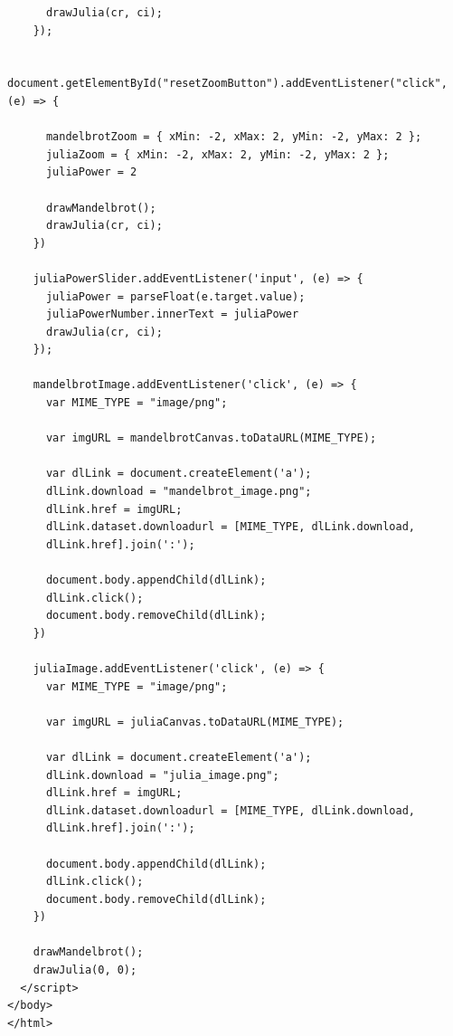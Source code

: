 \documentclass[12pt,a4paper]{report}
\begin{document}
\begin{verbatim}
      drawJulia(cr, ci);
    });

    document.getElementById("resetZoomButton").addEventListener("click", (e) => {

      mandelbrotZoom = { xMin: -2, xMax: 2, yMin: -2, yMax: 2 };
      juliaZoom = { xMin: -2, xMax: 2, yMin: -2, yMax: 2 };
      juliaPower = 2

      drawMandelbrot();
      drawJulia(cr, ci);
    })

    juliaPowerSlider.addEventListener('input', (e) => {
      juliaPower = parseFloat(e.target.value);
      juliaPowerNumber.innerText = juliaPower
      drawJulia(cr, ci);
    });

    mandelbrotImage.addEventListener('click', (e) => {
      var MIME_TYPE = "image/png";

      var imgURL = mandelbrotCanvas.toDataURL(MIME_TYPE);

      var dlLink = document.createElement('a');
      dlLink.download = "mandelbrot_image.png";
      dlLink.href = imgURL;
      dlLink.dataset.downloadurl = [MIME_TYPE, dlLink.download, 
      dlLink.href].join(':');

      document.body.appendChild(dlLink);
      dlLink.click();
      document.body.removeChild(dlLink);
    })

    juliaImage.addEventListener('click', (e) => {
      var MIME_TYPE = "image/png";

      var imgURL = juliaCanvas.toDataURL(MIME_TYPE);

      var dlLink = document.createElement('a');
      dlLink.download = "julia_image.png";
      dlLink.href = imgURL;
      dlLink.dataset.downloadurl = [MIME_TYPE, dlLink.download, 
      dlLink.href].join(':');

      document.body.appendChild(dlLink);
      dlLink.click();
      document.body.removeChild(dlLink);
    })

    drawMandelbrot();
    drawJulia(0, 0);
  </script>
</body>
</html>
\end{verbatim}
\end{document}
